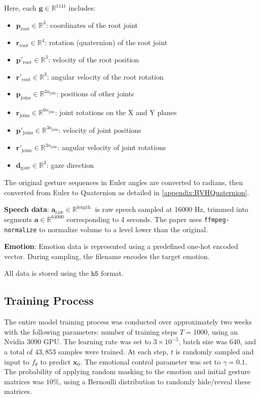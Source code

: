 Here, each $\mathbf{g} \in \mathbb{R}^{1141}$ includes:
{
	\begin{itemize}
		\item $\mathbf{p}_{\text{root}} \in \mathbb{R}^3$: coordinates of the root joint
		\item $\mathbf{r}_{\text{root}} \in \mathbb{R}^4$: rotation (quaternion) of the root joint
		\item $\mathbf{p}'_{\text{root}} \in \mathbb{R}^3$: velocity of the root position
		\item $\mathbf{r}'_{\text{root}} \in \mathbb{R}^3$: angular velocity of the root rotation
		
		\item $\mathbf{p}_{\text{joins}} \in \mathbb{R}^{3 n_{\text{join} }}$: positions of other joints
		\item $\mathbf{r}_{\text{joins}} \in \mathbb{R}^{6 n_{\text{join} }}$: joint rotations on the X and Y planes
		\item $\mathbf{p}'_{\text{joins}} \in \mathbb{R}^{3n_{\text{join} }}$: velocity of joint positions
		\item $\mathbf{r}'_{\text{joins}} \in \mathbb{R}^{3n_{\text{join} }}$: angular velocity of joint rotations
		\item $\mathbf{d}_{\text{gaze}} \in \mathbb{R}^3$: gaze direction
\end{itemize}}

The original gesture sequences in Euler angles are converted to radians, then converted from Euler to Quaternion as detailed in \autoref{appendix:BVHQuaternion}.

\textbf{Speech data}: $\mathbf{a}_{\text{raw}} \in \mathbb{R}^{ \text{length } }$ is raw speech sampled at 16000 Hz, trimmed into segments $\mathbf{a} \in \mathbb{R}^{64000}$ corresponding to 4 seconds. The paper uses \texttt{ffmpeg-normalize} to normalize volume to a level lower than the original.

\textbf{Emotion}: Emotion data is represented using a predefined one-hot encoded vector. During sampling, the filename encodes the target emotion.

All data is stored using the $\texttt{h5}$ format.

\subsection{Training Process}

The entire model training process was conducted over approximately two weeks with the following parameters: number of training steps $T = 1000$, using an Nvidia 3090 GPU. The learning rate was set to $3 \times 10^{-5}$, batch size was $640$, and a total of $43,853$ samples were trained. At each step, $t$ is randomly sampled and input to $f_{\theta}$ to predict $\mathbf{x}_{0}$. The emotional control parameter was set to $\gamma = 0.1$. The probability of applying random masking to the emotion and initial gesture matrices was $10\%$, using a Bernoulli distribution to randomly hide/reveal these matrices.

